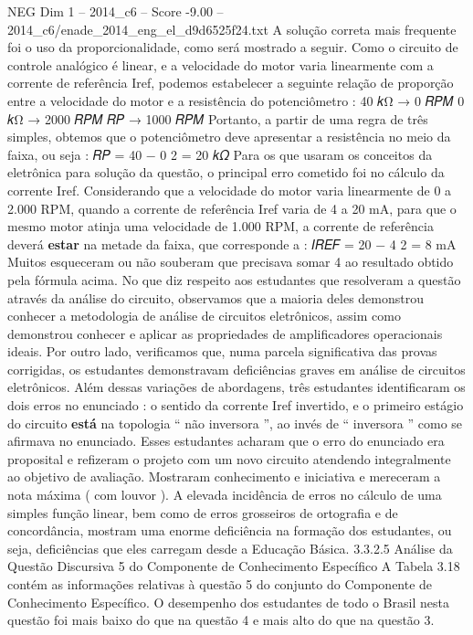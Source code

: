 \begin{textsample}{NEG Dim 1 – 2014\_c6 – Score -9.00 – 2014\_c6/enade\_2014\_eng\_el\_d9d6525f24.txt}
A solução correta mais frequente foi o uso da proporcionalidade, como será mostrado a seguir.
Como o circuito de controle analógico é linear, e a velocidade do motor varia linearmente com a corrente de referência Iref, podemos estabelecer a seguinte relação de proporção entre a velocidade do motor e a resistência do potenciômetro : 40 𝑘Ω → 0 𝑅𝑃𝑀 0 𝑘Ω → 2000 𝑅𝑃𝑀 𝑅𝑃 → 1000 𝑅𝑃𝑀 Portanto, a partir de uma regra de três simples, obtemos que o potenciômetro deve apresentar a resistência no meio da faixa, ou seja : 𝑅𝑃 = 40 − 0 2 = 20 𝑘𝛺 Para os que usaram os conceitos da eletrônica para solução da questão, o principal erro cometido foi no cálculo da corrente Iref.
Considerando que a velocidade do motor varia linearmente de 0 a 2.000 RPM, quando a corrente de referência Iref varia de 4 a 20 mA, para que o mesmo motor atinja uma velocidade de 1.000 RPM, a corrente de referência deverá \textbf{estar} na metade da faixa, que corresponde a : 𝐼𝑅𝐸𝐹 = 20 − 4 2 = 8 mA Muitos esqueceram ou não souberam que precisava somar 4 ao resultado obtido pela fórmula acima.
No que diz respeito aos estudantes que resolveram a questão através da análise do circuito, observamos que a maioria deles demonstrou conhecer a metodologia de análise de circuitos eletrônicos, assim como demonstrou conhecer e aplicar as propriedades de amplificadores operacionais ideais.
Por outro lado, verificamos que, numa parcela significativa das provas corrigidas, os estudantes demonstravam deficiências graves em análise de circuitos eletrônicos.
Além dessas variações de abordagens, três estudantes identificaram os dois erros no enunciado : o sentido da corrente Iref invertido, e o primeiro estágio do circuito \textbf{está} na topologia “ não inversora ”, ao invés de “ inversora ” como se afirmava no enunciado.
Esses estudantes acharam que o erro do enunciado era proposital e refizeram o projeto com um novo circuito atendendo integralmente ao objetivo de avaliação.
Mostraram conhecimento e iniciativa e mereceram a nota máxima ( com louvor ).
A elevada incidência de erros no cálculo de uma simples função linear, bem como de erros grosseiros de ortografia e de concordância, mostram uma enorme deficiência na formação dos estudantes, ou seja, deficiências que eles carregam desde a Educação Básica. 3.3.2.5 Análise da Questão Discursiva 5 do Componente de Conhecimento Específico A Tabela 3.18 contém as informações relativas à questão 5 do conjunto do Componente de Conhecimento Específico.
O desempenho dos estudantes de todo o Brasil nesta questão foi mais baixo do que na questão 4 e mais alto do que na questão 3.

\end{textsample}
